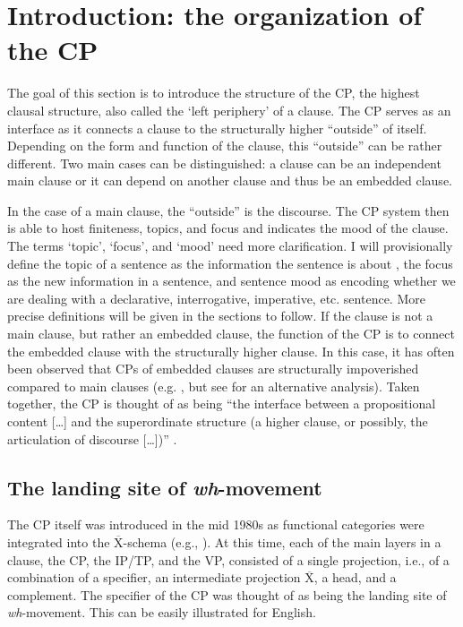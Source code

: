 \section{Introduction: the organization of the CP}\label{introcpchapter}
The goal of this section is to introduce the structure of the CP, the highest clausal structure, also called the `left periphery' of a clause. The CP serves as an interface as it connects a clause to the structurally higher ``outside'' of itself. Depending on the form and function of the clause, this ``outside'' can be rather different. Two main cases can be distinguished: a clause can be an independent main clause or it can depend on another clause and thus be an embedded clause. 

In the case of a main clause, the ``outside'' is the discourse. The CP system then is able to host finiteness, topics, and focus and indicates the mood of the clause. The terms `topic', `focus', and `mood' need more clarification. I will provisionally define the topic of a sentence as the information the sentence is about \citep{reinhart1981pragmatics}, the focus as the new information in a sentence, and sentence mood as encoding whether we are dealing with a declarative, interrogative, imperative, etc. sentence. More precise definitions will be given in the sections to follow. If the clause is not a main clause, but rather an embedded clause, the function of the CP is to connect the embedded clause with the structurally higher clause. In this case, it has often been observed that CPs of embedded clauses are structurally impoverished compared to main clauses (e.g. \citealt{haegeman2003conditional}, but see \citealt{haegeman2013syntax} for an alternative analysis). Taken together, the CP is thought of as being ``the interface between a propositional content [\dots ] and the superordinate structure (a higher clause, or possibly, the articulation of discourse [\dots ])'' \citep[283]{rizzi1997fine}.

\subsection{The landing site of \textit{wh}-movement}

The CP itself was introduced in the mid 1980s as functional categories were integrated into the $\overline{\textrm{X}}$-schema (e.g., \citealt{chomsky1986barr, speas1986ecifiers}). At this time, each of the main layers in a clause, the CP, the IP/TP, and the VP, consisted of a single projection, i.e., of a combination of a specifier, an intermediate projection $\overline{\textrm{X}}$, a head, and a complement. The specifier of the CP was thought of as being the landing site of \textit{wh}-movement. This can be easily illustrated for English. 

